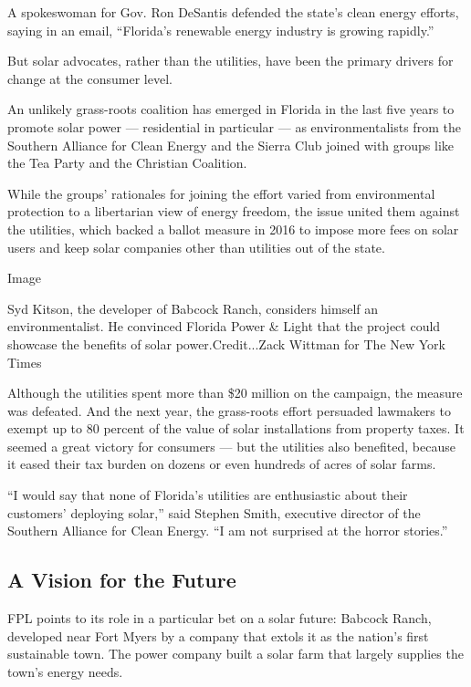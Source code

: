 A spokeswoman for Gov. Ron DeSantis defended the state's clean energy
efforts, saying in an email, ``Florida's renewable energy industry is
growing rapidly.''

But solar advocates, rather than the utilities, have been the primary
drivers for change at the consumer level.

An unlikely grass-roots coalition has emerged in Florida in the last
five years to promote solar power --- residential in particular --- as
environmentalists from the Southern Alliance for Clean Energy and the
Sierra Club joined with groups like the Tea Party and the Christian
Coalition.

While the groups' rationales for joining the effort varied from
environmental protection to a libertarian view of energy freedom, the
issue united them against the utilities, which backed a ballot measure
in 2016 to impose more fees on solar users and keep solar companies
other than utilities out of the state.

Image

Syd Kitson, the developer of Babcock Ranch, considers himself an
environmentalist. He convinced Florida Power \& Light that the project
could showcase the benefits of solar power.Credit...Zack Wittman for The
New York Times

Although the utilities spent more than \$20 million on the campaign, the
measure was defeated. And the next year, the grass-roots effort
persuaded lawmakers to exempt up to 80 percent of the value of solar
installations from property taxes. It seemed a great victory for
consumers --- but the utilities also benefited, because it eased their
tax burden on dozens or even hundreds of acres of solar farms.

``I would say that none of Florida's utilities are enthusiastic about
their customers' deploying solar,'' said Stephen Smith, executive
director of the Southern Alliance for Clean Energy. ``I am not surprised
at the horror stories.''

\hypertarget{a-vision-for-the-future}{%
\subsection{A Vision for the Future}\label{a-vision-for-the-future}}

FPL points to its role in a particular bet on a solar future: Babcock
Ranch, developed near Fort Myers by a company that extols it as the
nation's first sustainable town. The power company built a solar farm
that largely supplies the town's energy needs.

